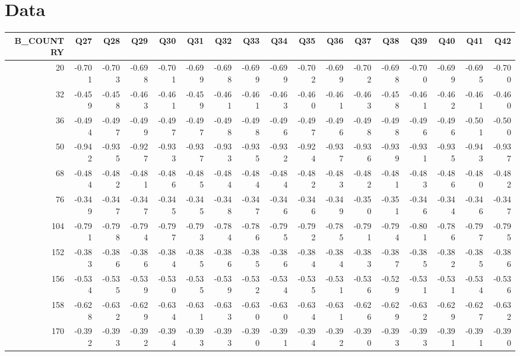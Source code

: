 \documentclass{amsart}
\begin{document}
\section{Data}
\begin{landscape}
\begin{longtable}{rrrrrrrrrrrrrrrrr}
  \hline
B\_COUNTRY & Q27 & Q28 & Q29 & Q30 & Q31 & Q32 & Q33 & Q34 & Q35 & Q36 & Q37 & Q38 & Q39 & Q40 & Q41 & Q42 \\ 
  \hline
20 & -0.701 & -0.703 & -0.698 & -0.701 & -0.699 & -0.698 & -0.699 & -0.699 & -0.702 & -0.699 & -0.702 & -0.698 & -0.700 & -0.699 & -0.695 & -0.700 \\ 
  32 & -0.459 & -0.458 & -0.463 & -0.461 & -0.459 & -0.461 & -0.461 & -0.463 & -0.460 & -0.461 & -0.463 & -0.458 & -0.461 & -0.462 & -0.461 & -0.460 \\ 
  36 & -0.494 & -0.497 & -0.499 & -0.497 & -0.497 & -0.498 & -0.498 & -0.496 & -0.497 & -0.496 & -0.498 & -0.498 & -0.496 & -0.496 & -0.501 & -0.500 \\ 
  50 & -0.942 & -0.935 & -0.927 & -0.933 & -0.937 & -0.933 & -0.935 & -0.932 & -0.924 & -0.937 & -0.936 & -0.939 & -0.931 & -0.935 & -0.943 & -0.937 \\ 
  68 & -0.484 & -0.482 & -0.481 & -0.486 & -0.485 & -0.484 & -0.484 & -0.484 & -0.482 & -0.483 & -0.482 & -0.481 & -0.483 & -0.486 & -0.480 & -0.482 \\ 
  76 & -0.349 & -0.347 & -0.347 & -0.345 & -0.345 & -0.348 & -0.347 & -0.346 & -0.346 & -0.349 & -0.350 & -0.351 & -0.346 & -0.344 & -0.346 & -0.347 \\ 
  104 & -0.791 & -0.798 & -0.794 & -0.797 & -0.793 & -0.784 & -0.786 & -0.795 & -0.792 & -0.785 & -0.791 & -0.794 & -0.801 & -0.786 & -0.797 & -0.795 \\ 
  152 & -0.383 & -0.386 & -0.386 & -0.384 & -0.385 & -0.386 & -0.385 & -0.386 & -0.384 & -0.384 & -0.383 & -0.387 & -0.385 & -0.382 & -0.385 & -0.386 \\ 
  156 & -0.534 & -0.535 & -0.539 & -0.530 & -0.535 & -0.539 & -0.532 & -0.534 & -0.535 & -0.531 & -0.536 & -0.529 & -0.531 & -0.531 & -0.534 & -0.536 \\ 
  158 & -0.628 & -0.632 & -0.629 & -0.634 & -0.631 & -0.633 & -0.630 & -0.630 & -0.634 & -0.631 & -0.626 & -0.629 & -0.632 & -0.629 & -0.627 & -0.632 \\ 
  170 & -0.392 & -0.393 & -0.392 & -0.394 & -0.393 & -0.393 & -0.390 & -0.391 & -0.394 & -0.392 & -0.390 & -0.393 & -0.393 & -0.391 & -0.391 & -0.390 \\ 

\end{longtable}
\end{landscape}
\end{document}

